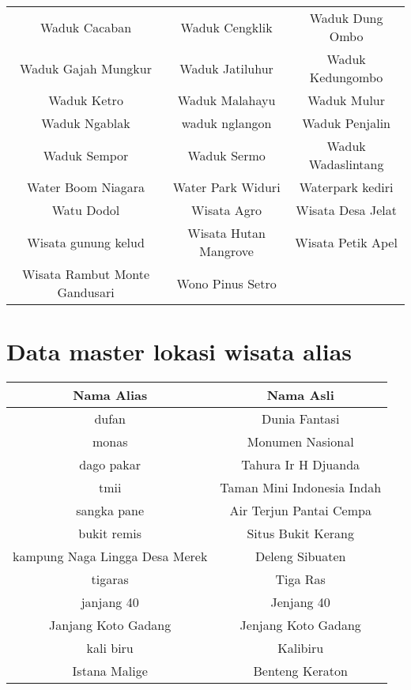 \begin{table}[H]
	\tiny
	\centering
	\begin{tabular}{ c | c | c}
Waduk Cacaban & Waduk Cengklik & Waduk Dung Ombo\\
Waduk Gajah Mungkur & Waduk Jatiluhur & Waduk Kedungombo\\
Waduk Ketro & Waduk Malahayu & Waduk Mulur\\
Waduk Ngablak & waduk nglangon & Waduk Penjalin\\
Waduk Sempor & Waduk Sermo & Waduk Wadaslintang\\
Water Boom Niagara & Water Park Widuri & Waterpark kediri\\
Watu Dodol & Wisata Agro & Wisata Desa Jelat\\
Wisata gunung kelud & Wisata Hutan Mangrove & Wisata Petik Apel\\
Wisata Rambut Monte Gandusari & Wono Pinus Setro\\
	\end{tabular}	
\end{table}	

\section{Data master lokasi wisata alias}
\begin{table}[H]
	\tiny
	\centering
	\begin{tabular}{ c | c }
	Nama Alias & Nama Asli \\
	\hline
dufan & Dunia Fantasi \\
monas & Monumen Nasional \\
dago pakar & Tahura Ir H Djuanda \\
tmii & Taman Mini Indonesia Indah \\
sangka pane & Air Terjun Pantai Cempa \\
bukit remis & Situs Bukit Kerang \\
kampung Naga Lingga Desa Merek & Deleng Sibuaten \\
tigaras & Tiga Ras \\
janjang 40 &  Jenjang 40 \\
Janjang Koto Gadang & Jenjang Koto Gadang \\
kali biru & Kalibiru \\
Istana Malige & Benteng Keraton \\
	\end{tabular}	
\end{table}	
